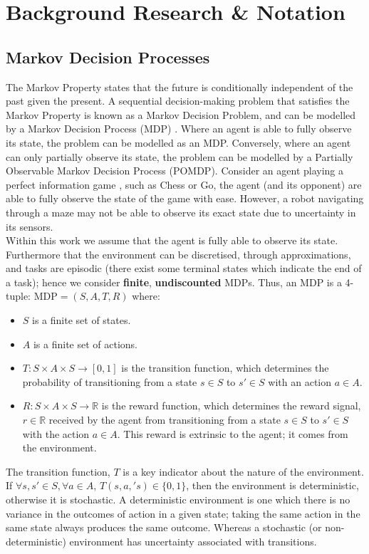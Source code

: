 \chapter{Background Research \& Notation}
\label{chapter2}
\section{Markov Decision Processes}
The Markov Property states that the future is conditionally independent of the past given the present. A sequential decision-making problem that satisfies the Markov Property is known as a Markov Decision Problem, and can be modelled by a Markov Decision Process (MDP) \citep{10.5555/528623}. Where an agent is able to fully observe its state, the problem can be modelled as an MDP. Conversely, where an agent can only partially observe its state, the problem can be modelled by a Partially Observable Markov Decision Process (POMDP).
Consider an agent playing a perfect information game \citep{vonneumann.morgenstern47}, such as Chess or Go, the agent (and its opponent) are able to fully observe the state of the game with ease. However, a robot navigating through a maze may not be able to observe its exact state due to uncertainty in its sensors.
\\Within this work we assume that the agent is fully able to observe its state. Furthermore that the environment can be discretised, through approximations, and tasks are episodic (there exist some terminal states which indicate the end of a task); hence we consider \textbf{finite}, \textbf{undiscounted} MDPs.
Thus, an MDP is a 4-tuple: $\text{MDP} = (S,A,T,R)$ where:
\begin{itemize}
    \item $S$ is a finite set of states.
    \item $A$ is a finite set of actions.
    \item $T : S \times A \times S \rightarrow [0,1]$ is the transition function, which determines the probability of transitioning from a state $s \in S$ to $s' \in S$ with an action $a \in A$.
    \item $R:S \times A \times S \rightarrow \mathbb{R}$ is the reward function, which determines the reward signal, $r \in \mathbb{R}$ received by the agent from transitioning from a state $s \in S$ to $s' \in S$ with the action $a \in A$. This reward is extrinsic to the agent; it comes from the environment.
\end{itemize}
The transition function, $T$ is a key indicator about the nature of the environment.
If $\forall s,s' \in S, \forall a \in A$, $T(s,a,'s) \in \{0,1\}$, then the environment is deterministic, otherwise it is stochastic.
A deterministic environment is one which there is no variance in the outcomes of action in a given state; taking the same action in the same state always produces the same outcome. Whereas a stochastic (or non-deterministic) environment has uncertainty associated with transitions.
